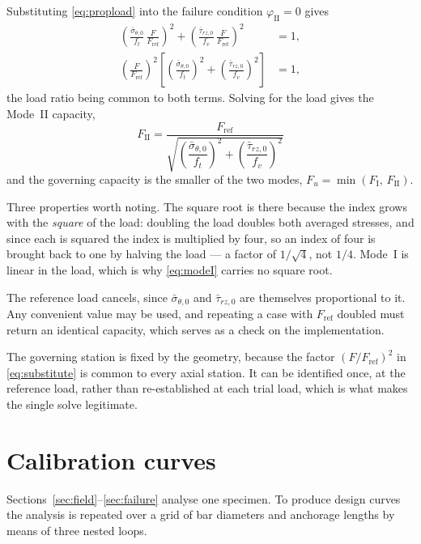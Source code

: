 Substituting \eqref{eq:propload} into the failure condition
$\varphi_{\mathrm{II}} = 0$ gives
\begin{align}
\label{eq:substitute}
\left(\frac{\bar{\sigma}_{\theta,0}}{f_t}\,
      \frac{F}{F_{\mathrm{ref}}}\right)^{2}
  + \left(\frac{\bar{\tau}_{rz,0}}{f_v}\,
      \frac{F}{F_{\mathrm{ref}}}\right)^{2}
  &= 1 , \nonumber \\[6pt]
\left(\frac{F}{F_{\mathrm{ref}}}\right)^{2}
\left[\left(\frac{\bar{\sigma}_{\theta,0}}{f_t}\right)^{2}
    + \left(\frac{\bar{\tau}_{rz,0}}{f_v}\right)^{2}\right]
  &= 1 ,
\end{align}
the load ratio being common to both terms. Solving for the load gives the
Mode~II capacity,
\begin{equation}
\label{eq:capacity}
\boxed{\;
F_{\mathrm{II}} = \frac{F_{\mathrm{ref}}}
  {\sqrt{\left(\dfrac{\bar{\sigma}_{\theta,0}}{f_t}\right)^{2}
       + \left(\dfrac{\bar{\tau}_{rz,0}}{f_v}\right)^{2}}}\;}
\end{equation}
and the governing capacity is the smaller of the two modes,
$F_u = \min\left(F_{\mathrm{I}},\, F_{\mathrm{II}}\right)$.
 
Three properties worth noting. The square root is there because the index grows
with the \emph{square} of the load: doubling the load doubles both averaged
stresses, and since each is squared the index is multiplied by four, so an
index of four is brought back to one by halving the load --- a factor of
$1/\sqrt{4}$, not $1/4$. Mode~I is linear in the load, which is why
\eqref{eq:modeI} carries no square root.
 
The reference load cancels, since $\bar{\sigma}_{\theta,0}$ and
$\bar{\tau}_{rz,0}$ are themselves proportional to it. Any convenient value
may be used, and repeating a case with $F_{\mathrm{ref}}$ doubled must return
an identical capacity, which serves as a check on the implementation.
 
The governing station is fixed by the geometry, because the factor
$(F/F_{\mathrm{ref}})^2$ in \eqref{eq:substitute} is common to every axial
station. It can be identified once, at the reference load, rather than
re-established at each trial load, which is what makes the single solve
legitimate.

\section{Calibration curves}
\label{sec:calibration}

Sections~\ref{sec:field}--\ref{sec:failure} analyse one specimen. To produce
design curves the analysis is repeated over a grid of bar diameters and
anchorage lengths by means of three nested loops.
 
